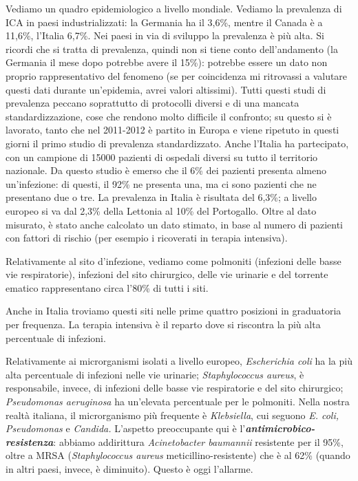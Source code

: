 \documentclass[]{article}
\begin{document}
Vediamo un quadro epidemiologico a livello mondiale. Vediamo la
prevalenza di ICA in paesi industrializzati: la Germania ha il 3,6\%,
mentre il Canada è a 11,6\%, l'Italia 6,7\%. Nei paesi in via di
sviluppo la prevalenza è più alta. Si ricordi che si tratta di
prevalenza, quindi non si tiene conto dell'andamento (la Germania il
mese dopo potrebbe avere il 15\%): potrebbe essere un dato non proprio
rappresentativo del fenomeno (se per coincidenza mi ritrovassi a
valutare questi dati durante un'epidemia, avrei valori altissimi). Tutti
questi studi di prevalenza peccano soprattutto di protocolli diversi e
di una mancata standardizzazione, cose che rendono molto difficile il
confronto; su questo si è lavorato, tanto che nel 2011-2012 è partito in
Europa e viene ripetuto in questi giorni il primo studio di prevalenza
standardizzato. Anche l'Italia ha partecipato, con un campione di 15000
pazienti di ospedali diversi su tutto il territorio nazionale. Da questo
studio è emerso che il 6\% dei pazienti presenta almeno un'infezione: di
questi, il 92\% ne presenta una, ma ci sono pazienti che ne presentano
due o tre. La prevalenza in Italia è risultata del 6,3\%; a livello
europeo si va dal 2,3\% della Lettonia al 10\% del Portogallo. Oltre al
dato misurato, è stato anche calcolato un dato stimato, in base al
numero di pazienti con fattori di rischio (per esempio i ricoverati in
terapia intensiva).

Relativamente al sito d'infezione, vediamo come polmoniti (infezioni
delle basse vie respiratorie), infezioni del sito chirurgico, delle vie
urinarie e del torrente ematico rappresentano circa l'80\% di tutti i
siti.

Anche in Italia troviamo questi siti nelle prime quattro posizioni in
graduatoria per frequenza. La terapia intensiva è il reparto dove si
riscontra la più alta percentuale di infezioni.

Relativamente ai microrganismi isolati a livello europeo,
\emph{Escherichia coli} ha la più alta percentuale di infezioni nelle
vie urinarie; \emph{Staphylococcus aureus}, è responsabile, invece, di
infezioni delle basse vie respiratorie e del sito chirurgico;
\emph{Pseudomonas aeruginosa} ha un'elevata percentuale per le
polmoniti. Nella nostra realtà italiana, il microrganismo più frequente
è \emph{Klebsiella}, cui seguono \emph{E. coli, Pseudomonas} e
\emph{Candida.} L'aspetto preoccupante qui è
l'\textbf{\emph{antimicrobico-resistenza}}: abbiamo addirittura
\emph{Acinetobacter baumannii} resistente per il 95\%, oltre a MRSA
(\emph{Staphylococcus aureus} meticillino-resistente) che è al 62\%
(quando in altri paesi, invece, è diminuito). Questo è oggi l'allarme.
\end{document}
